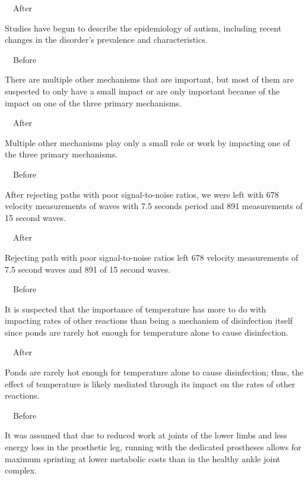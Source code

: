 \documentclass[a4paper, 12pt]{article}
\begin{document}
\par\ \textbullet\ After
\par Studies have begun to describe the epidemiology of autism, including recent changes in the disorder's prevalence and characteristics.

\par\ \textbullet\ Before
\par There are multiple other mechanisms that are important, but most of them are suspected to only have a small impact or are only important because of the impact on one of the three primary mechanisms.

\par\ \textbullet\ After
\par Multiple other mechanisms play only a small role or work by impacting one of the three primary mechanisms.

\par\ \textbullet\ Before
\par After rejecting paths with poor signal-to-noise ratios, we were left with 678 velocity measurements of waves with 7.5 seconds period and 891 measurements of 15 second waves.

\par\ \textbullet\ After
\par Rejecting path with poor signal-to-noise ratios left 678 velocity measurements of 7.5 second waves and 891 of 15 second waves.

\par\ \textbullet\ Before
\par It is suspected that the importance of temperature has more to do with impacting rates of other reactions than being a mechanism of disinfection itself since ponds are rarely hot enough for temperature alone to cause disinfection.

\par\ \textbullet\ After
\par Ponds are rarely hot enough for temperature alone to cause disinfection; thus, the effect of temperature is likely mediated through its impact on the rates of other reactions.

\par\ \textbullet\ Before
\par It was assumed that due to reduced work at joints of the lower limbs and less energy loss in the prosthetic leg, running with the dedicated prostheses allows for maximum sprinting at lower metabolic costs than in the healthy ankle joint complex.
\end{document}
